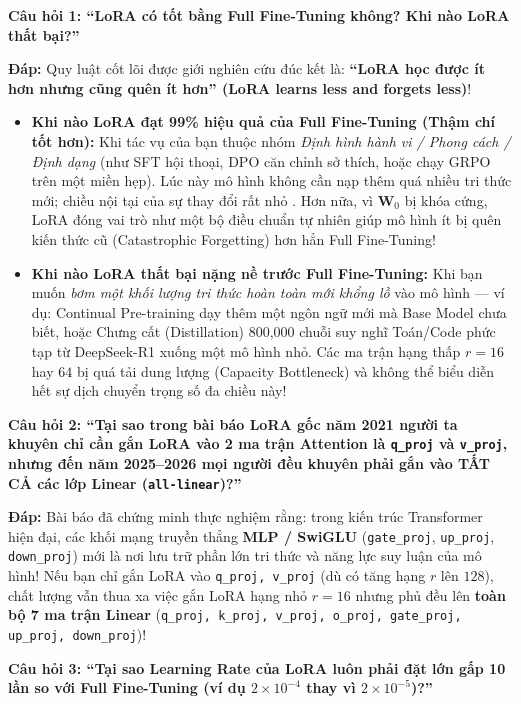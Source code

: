 \begin{debate}
\textbf{Câu hỏi 1: ``LoRA có tốt bằng Full Fine-Tuning không? Khi nào LoRA thất bại?''}

\textbf{Đáp:} Quy luật cốt lõi được giới nghiên cứu đúc kết là: \textbf{``LoRA học được ít hơn nhưng cũng quên ít hơn'' (LoRA learns less and forgets less)}!
\begin{itemize}
  \item \textbf{Khi nào LoRA đạt 99\% hiệu quả của Full Fine-Tuning (Thậm chí tốt hơn):} Khi tác vụ của bạn thuộc nhóm \textit{Định hình hành vi / Phong cách / Định dạng} (như SFT hội thoại, DPO căn chỉnh sở thích, hoặc chạy GRPO trên một miền hẹp). Lúc này mô hình không cần nạp thêm quá nhiều tri thức mới; chiều nội tại của sự thay đổi rất nhỏ \citep{aghajanyan2021intrinsic}. Hơn nữa, vì $\mathbf{W}_0$ bị khóa cứng, LoRA đóng vai trò như một bộ điều chuẩn tự nhiên giúp mô hình ít bị quên kiến thức cũ (Catastrophic Forgetting) hơn hẳn Full Fine-Tuning!
  \item \textbf{Khi nào LoRA thất bại nặng nề trước Full Fine-Tuning:} Khi bạn muốn \textit{bơm một khối lượng tri thức hoàn toàn mới khổng lồ} vào mô hình --- ví dụ: Continual Pre-training dạy thêm một ngôn ngữ mới mà Base Model chưa biết, hoặc Chưng cất (Distillation) 800,000 chuỗi suy nghĩ Toán/Code phức tạp từ DeepSeek-R1 xuống một mô hình nhỏ. Các ma trận hạng thấp $r = 16$ hay $64$ bị quá tải dung lượng (Capacity Bottleneck) và không thể biểu diễn hết sự dịch chuyển trọng số đa chiều này!
\end{itemize}

\medskip
\textbf{Câu hỏi 2: ``Tại sao trong bài báo LoRA gốc năm 2021 người ta khuyên chỉ cần gắn LoRA vào 2 ma trận Attention là \texttt{q\_proj} và \texttt{v\_proj}, nhưng đến năm 2025--2026 mọi người đều khuyên phải gắn vào TẤT CẢ các lớp Linear (\texttt{all-linear})?''}

\textbf{Đáp:} Bài báo \citet{dettmers2023qlora} đã chứng minh thực nghiệm rằng: trong kiến trúc Transformer hiện đại, các khối mạng truyền thẳng \textbf{MLP / SwiGLU} (\texttt{gate\_proj}, \texttt{up\_proj}, \texttt{down\_proj}) mới là nơi lưu trữ phần lớn tri thức và năng lực suy luận của mô hình! Nếu bạn chỉ gắn LoRA vào \texttt{q\_proj, v\_proj} (dù có tăng hạng $r$ lên $128$), chất lượng vẫn thua xa việc gắn LoRA hạng nhỏ $r = 16$ nhưng phủ đều lên \textbf{toàn bộ 7 ma trận Linear} (\texttt{q\_proj, k\_proj, v\_proj, o\_proj, gate\_proj, up\_proj, down\_proj})!

\medskip
\textbf{Câu hỏi 3: ``Tại sao Learning Rate của LoRA luôn phải đặt lớn gấp 10 lần so với Full Fine-Tuning (ví dụ $2 \times 10^{-4}$ thay vì $2 \times 10^{-5}$)?''}


\end{debate}
